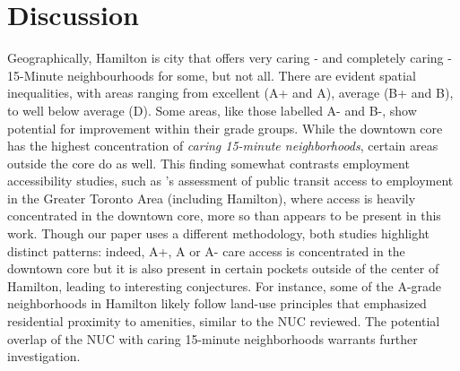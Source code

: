 \documentclass[
  authoryear,
  preprint,
  3p]{elsarticle}
\begin{document}
\section{Discussion}\label{discussion}

Geographically, Hamilton is city that offers very caring - and
completely caring - 15-Minute neighbourhoods for some, but not all.
There are evident spatial inequalities, with areas ranging from
excellent (A+ and A), average (B+ and B), to well below average (D).
Some areas, like those labelled A- and B-, show potential for
improvement within their grade groups. While the downtown core has the
highest concentration of \emph{caring 15-minute neighborhoods}, certain
areas outside the core do as well. This finding somewhat contrasts
employment accessibility studies, such as
\citet{elgeneidyNonstopEquityAssessing2016}'s assessment of public
transit access to employment in the Greater Toronto Area (including
Hamilton), where access is heavily concentrated in the downtown core,
more so than appears to be present in this work. Though our paper uses a
different methodology, both studies highlight distinct patterns: indeed,
A+, A or A- care access is concentrated in the downtown core but it is
also present in certain pockets outside of the center of Hamilton,
leading to interesting conjectures. For instance, some of the A-grade
neighborhoods in Hamilton likely follow land-use principles that
emphasized residential proximity to amenities, similar to the NUC
reviewed. The potential overlap of the NUC with caring 15-minute
neighborhoods warrants further investigation.
\end{document}
